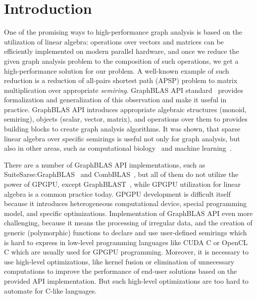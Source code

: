 \section{Introduction}

One of the promising ways to high-performance graph analysis is based on the utilization of linear algebra: operations over vectors and matrices can be efficiently implemented on modern parallel hardware, and once we reduce the given graph analysis problem to the composition of such operations, we get a high-performance solution for our problem. 
A well-known example of such reduction is a reduction of all-pairs shortest path (APSP) problem to matrix multiplication over appropriate \textit{semiring}.
GraphBLAS API standard~\cite{7761646} provides formalization and generalization of this observation and make it useful in practice. 
GraphBLAS API introduces appropriate algebraic structures (monoid, semiring), objects (scalar, vector, matrix), and operations over them to provides building blocks to create graph analysis algorithms.
It was shown, that sparse linear algebra over specific semirings is useful not only for graph analysis, but also in other areas, such as computational biology~\cite{10.5555/3433701.3433800} and machine learning~\cite{8091098}.

There are a number of GraphBLAS API implementations, such as SuiteSarse:GraphBLAS~\cite{10.1145/3322125} and CombBLAS~\cite{10.1177/1094342011403516}, but all of them do not utilize the power of GPGPU, except GraphBLAST~\cite{10.1145/3466795}, while GPGPU utilization for linear algebra is a common practice today. 
GPGPU development is difficult itself because it introduces heterogeneous computational device, special programming model, and specific optimizations.
Implementation of GraphBLAS API even more challenging, because it means the processing of irregular data, and the creation of generic (polymorphic) functions to declare and use user-defined semirings which is hard to express in low-level programming languages like CUDA C or OpenCL C which are usually used for GPGPU programming.
Moreover, it is necessary to use high-level optimizations, like kernel fusion or elimination of unnecessary computations to improve the performance of end-user solutions based on the provided API implementation.
But such high-level optimizations are too hard to automate for C-like languages.

